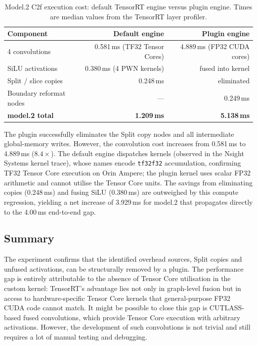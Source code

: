 \documentclass[12pt,a4paper]{report}
\begin{document}
\begin{table}[h]
\centering
\caption{Model.2 C2f execution cost: default TensorRT engine versus plugin engine.
Times are median values from the TensorRT layer profiler.}
\label{tab:plugin_vs_default}
\begin{tabular}{lrr}
\toprule
Component & Default engine & Plugin engine \\
\midrule
4 convolutions          & 0.581\,ms (TF32 Tensor Cores)  & 4.889\,ms (FP32 CUDA cores) \\
SiLU activations        & 0.380\,ms (4 PWN kernels)      & fused into kernel           \\
Split / slice copies    & 0.248\,ms                      & eliminated                  \\
Boundary reformat nodes & ---                            & 0.249\,ms                   \\
\midrule
\textbf{model.2 total}  & \textbf{1.209\,ms}             & \textbf{5.138\,ms}          \\
\bottomrule
\end{tabular}
\end{table}

\noindent The plugin successfully eliminates the Split copy nodes and all intermediate
global-memory writes.
However, the convolution cost increases from 0.581\,ms to 4.889\,ms ($8.4{\times}$).
The default engine dispatches  kernels (observed in the Nsight
Systems kernel trace), whose names encode \texttt{tf32f32} accumulation, confirming
TF32 Tensor Core execution on Orin Ampere; the plugin kernel uses scalar FP32 arithmetic
and cannot utilise the Tensor Core units.
The savings from eliminating copies (0.248\,ms) and fusing SiLU (0.380\,ms) are
outweighed by this compute regression, yielding a net increase of 3.929\,ms for model.2
that propagates directly to the 4.00\,ms end-to-end gap.

\subsection{Summary}

The experiment confirms that the identified overhead sources, Split copies and unfused
activations, can be structurally removed by a plugin.
The performance gap is entirely attributable to the absence of Tensor Core utilisation
in the custom kernel: TensorRT's advantage lies not only in graph-level fusion but in
access to hardware-specific Tensor Core kernels that general-purpose FP32 CUDA code
cannot match. It might be possible to  close this gap is CUTLASS-based fused convolutions,
which provide  Tensor Core execution with arbitrary activations. However, the development of such
convolutions is not trivial and still requires a lot of manual testing and debugging.
\end{document}
